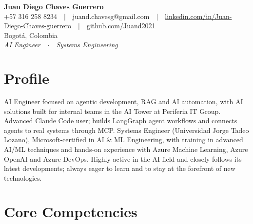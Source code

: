 
\ifpdftex\usepackage[T1]{fontenc}\fi %


\begin{center}
{\large\bfseries\atsspaces Juan Diego Chaves Guerrero}\\[1pt]
{\small +57 316 258 8234\ \ $|$\ \ juand.chavesg@gmail.com\ \ $|$\ \ \href{https://linkedin.com/in/Juan-Diego-Chaves-guerrero}{linkedin.com/in/Juan-Diego-Chaves-guerrero}\ \ $|$\ \ \href{https://github.com/Juand2021}{github.com/Juand2021}}\\
{\small Bogotá, Colombia}\\[1pt]
{\small\itshape\textcolor{meta}{AI Engineer\ \ $\cdot$\ \ Systems Engineering}}
\end{center}
\vspace{-8pt}

\section{Profile}
AI Engineer focused on agentic development, RAG and AI automation, with AI solutions built for internal teams in the AI Tower at Periferia IT Group. Advanced Claude Code user; builds LangGraph agent workflows and connects agents to real systems through MCP. Systems Engineer (Universidad Jorge Tadeo Lozano), Microsoft-certified in AI \& ML Engineering, with training in advanced AI/ML techniques and hands-on experience with Azure Machine Learning, Azure OpenAI and Azure DevOps. Highly active in the AI field and closely follows its latest developments; always eager to learn and to stay at the forefront of new technologies.

\section{Core Competencies}

